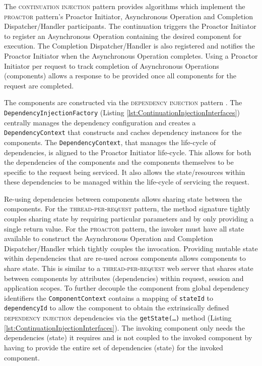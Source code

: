 \documentclass[prodmode]{style/acmlarge}
\begin{document}
The \textsc{continuation injection} pattern provides algorithms which implement the
\textsc{proactor} pattern's Proactor Initiator, Asynchronous Operation and
Completion Dispatcher/Handler participants.  The continuation triggers the
Proactor Initiator to register an Asynchronous Operation containing the desired
component for execution.  The Completion Dispatcher/Handler is also registered
and notifies the Proactor Initiator when the Asynchronous Operation completes.
Using a Proactor Initiator per request to track completion of Asynchronous
Operations (components) allows a response to be provided once all components for
the request are completed.

The components are constructed via the \textsc{dependency injection} pattern
\cite{ioc}.  The \texttt{Dependency\-InjectionFactory} (Listing
\ref{lst:ContinuationInjectionInterfaces}) centrally manages the dependency
configuration and creates a \texttt{Depend\-ency\-Context} that constructs and
caches dependency instances for the components.  The
\texttt{Dependency\-Context}, that manages the life-cycle of dependencies, is
aligned to the Proactor Initiator life-cycle.  This allows for both the
dependencies of the components and the components themselves to be specific to
the request being serviced.  It also allows the state/resources within these
dependencies to be managed within the life-cycle of servicing the request.

Re-using dependencies between components allows sharing state between the
components.  For the \textsc{thread-per-request} pattern, the method signature
tightly couples sharing state by requiring particular parameters and by only
providing a single return value.  For the \textsc{proactor} pattern, the invoker
must have all state available to construct the Asynchronous Operation and
Completion Dispatcher/Handler which tightly couples the invocation.  Providing
mutable state within dependencies that are re-used across components allows
components to share state.  This is similar to a \textsc{thread-per-request} web
server that shares state between components by attributes (dependencies) within
request, session and application scopes.  To further decouple the component from
global dependency identifiers the \texttt{ComponentContext} contains a mapping
of \texttt{stateId} to \texttt{dependencyId} to allow the component to obtain
the extrinsically defined \textsc{dependency injection} dependencies via the
\texttt{getState(\ldots)} method (Listing
\ref{lst:ContinuationInjectionInterfaces}).  The invoking component only needs
the dependencies (state) it requires and is not coupled to the invoked component
by having to provide the entire set of dependencies (state) for the invoked
component.
\end{document}
